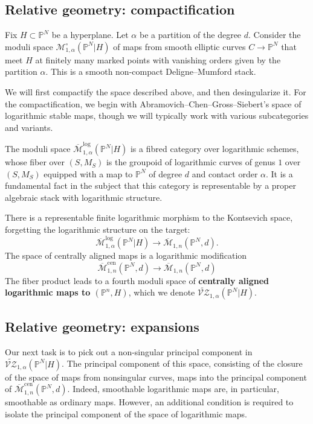 \documentclass[11pt]{amsart}
\renewcommand{\to}{\rightarrow}
\theoremstyle{definition}
\theoremstyle{definition}
\begin{document}
\subsection{Relative geometry: compactification} Fix $H\subset \mathbb P^N$ be a hyperplane. Let $\alpha$ be a partition of the degree $d$. Consider the moduli space $\mathcal M_{1,\alpha}^\circ(\mathbb P^N|H)$ of maps from smooth elliptic curves $C\to \mathbb P^N$ that meet $H$ at finitely many marked points with vanishing orders given by the partition $\alpha$. This is a smooth non-compact Deligne--Mumford stack. 

We will first compactify the space described above, and then desingularize it. For the compactification, we begin with Abramovich--Chen--Gross--Siebert's space of logarithmic stable maps, though we will typically work with various subcategories and variants. 

The moduli space $\overline{\mathcal{M}}^{\operatorname{log}}_{1,\alpha}(\mathbb P^N|H)$ is a fibred category over logarithmic schemes, whose fiber over $(S,M_S)$ is the groupoid of logarithmic curves of genus $1$ over $(S,M_S)$ equipped with a map to $\mathbb P^N$ of degree $d$ and contact order $\alpha$. It is a fundamental fact in the subject that this category is representable by a proper algebraic stack with logarithmic structure. 

There is a representable finite logarithmic morphism to the Kontsevich space, forgetting the logarithmic structure on the target:
$$
\overline{\mathcal M}^{\mathrm{log}}_{1,\alpha}(\mathbb P^N|H) \to \overline{\mathcal M}_{1,n}(\mathbb P^N,d).
$$
The space of centrally aligned maps is a logarithmic modification
$$
\overline{\mathcal M}^{\mathrm{cen}}_{1,n}(\mathbb P^N,d)\to\overline{ \mathcal M}_{1,n}(\mathbb P^N,d)
$$ 
The fiber product leads to a fourth moduli space of \textbf{centrally aligned logarithmic maps to $(\mathbb P^n,H)$}, which we denote $\widetilde{\mathcal{VZ}}_{1,\alpha}(\mathbb P^N|H)$.


\subsection{Relative geometry: expansions} Our next task is to pick out a non-singular principal component in $\widetilde{\mathcal{VZ}}_{1,\alpha}(\mathbb P^N|H)$. The principal component of this space, consisting of the closure of the space of maps from nonsingular curves, maps into the principal component of $\overline{\mathcal M}^{\mathrm{cen}}_{1,n}(\mathbb P^N,d)$. Indeed, smoothable logarithmic maps are, in particular, smoothable as ordinary maps. However, an additional condition is required to isolate the principal component of the space of logarithmic maps. 
\end{document}
